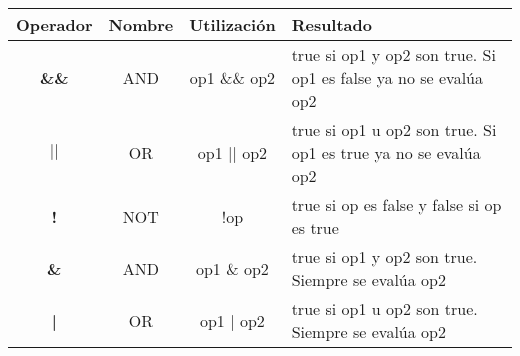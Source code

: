 \begin{tabular}{|c|c|c|p{7cm}|}
	\hline
	\textbf{Operador} & \textbf{Nombre} & \textbf{Utilización} & \textbf{Resultado } \\ \hline
	\textbf{ \&\&} & AND  &  op1 \&\& op2 & true si op1 y op2 son true. Si op1 es false ya no se evalúa op2 \\ \hline 
	\textbf{$||$} & OR & op1 || op2 & true si op1 u op2 son true. Si op1 es true ya no se evalúa op2 \\ \hline 
	\textbf{!} & NOT & !op & true si op es false y false si op es true \\ \hline
	\textbf{\&} & AND & op1 \& op2 & true si op1 y op2 son true. Siempre se evalúa op2\\ \hline
	\textbf{|} & OR & op1 | op2 & true si op1 u op2 son true. Siempre se evalúa op2 \\ \hline
	
\end{tabular}